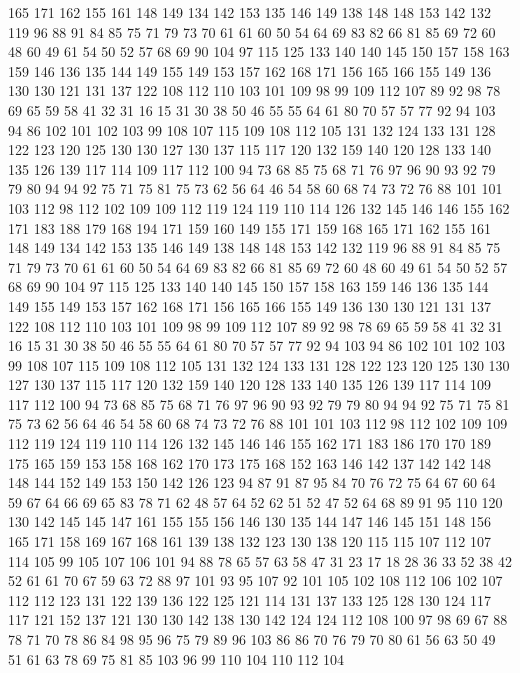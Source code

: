 165 171 162 155 161 148 149 134 142 153 135 146 149 138 148 148 153 142 132 119
96 88 91 84 85 75 71 79 73 70 61 61 60 50 54 64 69 83 82 66
81 85 69 72 60 48 60 49 61 54 50 52 57 68 69 90 104 97 115 125
133 140 140 145 150 157 158 163 159 146 136 135 144 149 155 149 153 157 162 168
171 156 165 166 155 149 136 130 130 121 131 137 122 108 112 110 103 101 109 98
99 109 112 107 89 92 98 78 69 65 59 58 41 32 31 16 15 31 30 38
50 46 55 55 64 61 80 70 57 57 77 92 94 103 94 86 102 101 102 103
99 108 107 115 109 108 112 105 131 132 124 133 131 128 122 123 120 125 130 130
127 130 137 115 117 120 132 159 140 120 128 133 140 135 126 139 117 114 109 117
112 100 94 73 68 85 75 68 71 76 97 96 90 93 92 79 79 80 94 94
92 75 71 75 81 75 73 62 56 64 46 54 58 60 68 74 73 72 76 88
101 101 103 112 98 112 102 109 109 112 119 124 119 110 114 126 132 145 146 146
155 162 171 183 188 179 168 194 171 159 160 149 155 171 159 168 165 171 162 155
161 148 149 134 142 153 135 146 149 138 148 148 153 142 132 119 96 88 91 84
85 75 71 79 73 70 61 61 60 50 54 64 69 83 82 66 81 85 69 72
60 48 60 49 61 54 50 52 57 68 69 90 104 97 115 125 133 140 140 145
150 157 158 163 159 146 136 135 144 149 155 149 153 157 162 168 171 156 165 166
155 149 136 130 130 121 131 137 122 108 112 110 103 101 109 98 99 109 112 107
89 92 98 78 69 65 59 58 41 32 31 16 15 31 30 38 50 46 55 55
64 61 80 70 57 57 77 92 94 103 94 86 102 101 102 103 99 108 107 115
109 108 112 105 131 132 124 133 131 128 122 123 120 125 130 130 127 130 137 115
117 120 132 159 140 120 128 133 140 135 126 139 117 114 109 117 112 100 94 73
68 85 75 68 71 76 97 96 90 93 92 79 79 80 94 94 92 75 71 75
81 75 73 62 56 64 46 54 58 60 68 74 73 72 76 88 101 101 103 112
98 112 102 109 109 112 119 124 119 110 114 126 132 145 146 146 155 162 171 183
186 170 170 189 175 165 159 153 158 168 162 170 173 175 168 152 163 146 142 137
142 142 148 148 144 152 149 153 150 142 126 123 94 87 91 87 95 84 70 76
72 75 64 67 60 64 59 67 64 66 69 65 83 78 71 62 48 57 64 52
62 51 52 47 52 64 68 89 91 95 110 120 130 142 145 145 147 161 155 155
156 146 130 135 144 147 146 145 151 148 156 165 171 158 169 167 168 161 139 138
132 123 130 138 120 115 115 107 112 107 114 105 99 105 107 106 101 94 88 78
65 57 63 58 47 31 23 17 18 28 36 33 52 38 42 52 61 61 70 67
59 63 72 88 97 101 93 95 107 92 101 105 102 108 112 106 102 107 112 112
123 131 122 139 136 122 125 121 114 131 137 133 125 128 130 124 117 117 121 152
137 121 130 130 142 138 130 142 124 124 112 108 100 97 98 69 67 88 78 71
70 78 86 84 98 95 96 75 79 89 96 103 86 86 70 76 79 70 80 61
56 63 50 49 51 61 63 78 69 75 81 85 103 96 99 110 104 110 112 104
